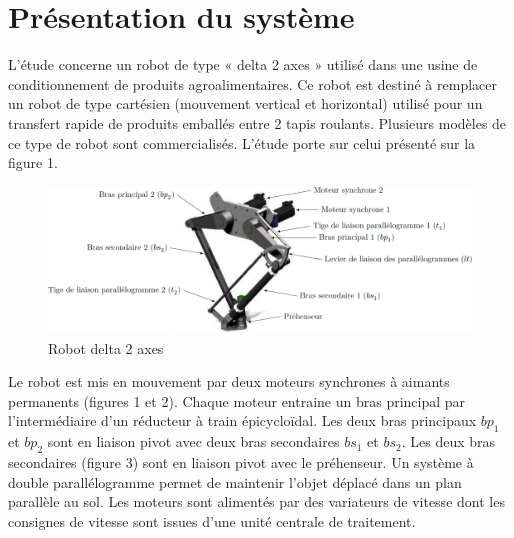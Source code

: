 \documentclass[10pt,fleqn]{article} %
\begin{document}

\vspace{4.5cm}
\pagestyle{fancy}
\thispagestyle{plain}

\def\columnseprulecolor{\color{ocre}}
\setlength{\columnseprule}{0.4pt} 




\section{Présentation du système}

\ifprof
\else
L’étude concerne un robot de type « delta 2 axes » utilisé dans une usine de conditionnement de produits
agroalimentaires. Ce robot est destiné à remplacer un robot de type cartésien (mouvement vertical et horizontal)
utilisé pour un transfert rapide de produits emballés entre 2 tapis roulants. Plusieurs modèles de ce type de
robot sont commercialisés. L’étude porte sur celui présenté sur la figure 1.



\begin{figure}[H]
\centering
\includegraphics[width=0.9\linewidth]{fig_01}
\caption{Robot delta 2 axes \label{fig_01}}
\end{figure}




Le robot est mis en mouvement par deux moteurs synchrones à aimants permanents (figures 1 et 2). Chaque moteur
entraine un bras principal par l’intermédiaire d’un réducteur à train épicycloïdal. Les deux bras principaux
$bp_1$ et $bp_2$ sont en liaison pivot avec deux bras secondaires $bs_1$ et $bs_2$. Les deux bras secondaires (figure 3) sont
en liaison pivot avec le préhenseur. Un système à double parallélogramme permet de maintenir l’objet déplacé
dans un plan parallèle au sol. Les moteurs sont alimentés par des variateurs de vitesse dont les consignes de
vitesse sont issues d’une unité centrale de traitement.
\end{document}
